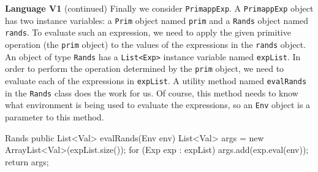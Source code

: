 \begin{minipage}[t]{\sw}
\slidenumber
\LARGE
{\bf Language V1} (continued)\exx
Finally we consider \verb'PrimappExp'.
A \verb'PrimappExp' object has two instance variables:
a \verb'Prim' object named \verb'prim'
and a \verb'Rands' object named \verb'rands'.
To evaluate such an expression,
we need to apply the given primitive operation
(the \verb'prim' object)
to the values of the expressions in the \verb'rands' object.\exx
An object of type \verb'Rands' has
a \verb'List<Exp>' instance variable named \verb'expList'.
In order to perform the operation determined by the \verb'prim' object,
we need to evaluate each of the expressions in \verb'expList'.
A utility method named \verb'evalRands' in the \verb'Rands' class
does the work for us.
Of course, this method needs to know what environment is being used
to evaluate the expressions,
so an \verb'Env' object is a parameter to this method.
{\Large
\begin{qv}
Rands
    public List<Val> evalRands(Env env) {
        List<Val> args = new ArrayList<Val>(expList.size());
        for (Exp exp : expList)
            args.add(exp.eval(env));
        return args;
    }
\end{qv}
}

\end{minipage}
\clearpage
